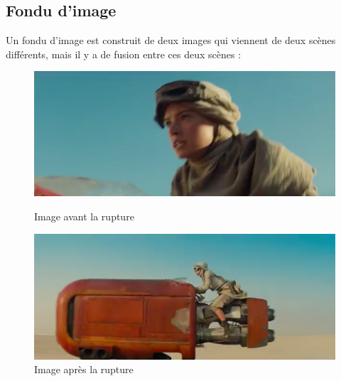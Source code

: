 \subsection{Fondu d'image}
Un fondu d’image est construit de deux images qui viennent de deux scènes différents, mais il y a de fusion entre ces deux scènes :

\begin{figure}[h!]
   \begin{minipage}[c]{.46\linewidth}
	  \centering
      \includegraphics[scale=0.3]{images/rupture2-1.png}
      \caption{\label{Avant} Image avant la rupture}
   \end{minipage} \hfill
   \begin{minipage}[c]{.46\linewidth}
      \centering
      \includegraphics[scale=0.3]{images/rupture2-2.png}
      \caption{\label{Après} Image après la rupture}
   \end{minipage}
\end{figure}